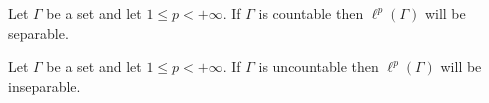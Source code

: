        \begin{example} \label{example: ell_p_spaces_of_countable_dimensions_are_separable}
            Let $\Gamma$ be a set and let $1 \leq p < +\infty$. If $\Gamma$ is countable then $\ell^p(\Gamma)$ will be separable.

        \end{example}
        \begin{example} \label{example: ell_p_spaces_of_uncountable_dimensions_finite_p_are_inseparable}
            Let $\Gamma$ be a set and let $1 \leq p < +\infty$. If $\Gamma$ is uncountable then $\ell^p(\Gamma)$ will be inseparable.
        \end{example}
